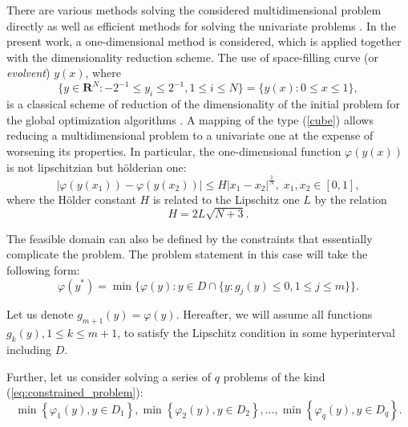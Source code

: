 \documentclass[runningheads]{llncs}
\begin{document}
There are various methods solving the considered multidimensional problem directly
\cite{SergeyevKvasov2017, Jones2009} as well as efficient methods for solving the univariate problems \cite{Norkin1992, Strongin2000}.
In the present work, a one-dimensional method is considered, which is applied together with the
dimensionality reduction scheme.
The use of space-filling curve (or \textit{evolvent}) $y(x)$, where
\begin{equation}
\label{cube}
\lbrace y\in \mathbf{R}^N:-2^{-1}\leqslant y_i\leqslant 2^{-1},1\leqslant i\leqslant
N\rbrace=\{y(x):0\leqslant x\leqslant 1\},
\end{equation}
 is a classical scheme of reduction of the
dimensionality of the initial problem for the global optimization algorithms
\cite{Sergeyev2013}.
A mapping of the type (\ref{cube}) allows reducing a multidimensional problem to a univariate one at the expense of worsening its properties. In particular, the 
one-dimensional function \(\varphi(y(x))\) is not lipschitzian but h\"{o}lderian one:
\begin{displaymath}
\label{holder}
|\varphi(y(x_1))-\varphi(y(x_2))|\leqslant H{|x_1-x_2|}^{\frac{1}{N}}, \; x_1,x_2\in[0,1],
\end{displaymath}
where the H\"{o}lder constant \(H\) is related to the Lipschitz one \(L\) by the relation
\begin{displaymath}
  H=2L\sqrt{N+3}.
\end{displaymath}

The feasible domain can also be defined by the constraints that essentially complicate the problem.
The problem statement in this case will take the following form:
\begin{equation}
  \label{eq:constrained_problem}
  \varphi(y^*)=\min\{\varphi(y):y\in D \cap \{y: g_j(y)\leqslant 0, 1\leqslant j\leqslant m\}\}.
\end{equation}

Let us denote \(g_{m+1}(y)=\varphi(y)\). Hereafter, we will assume all functions
\(g_k(y),1\leqslant k \leqslant m+1\),
to satisfy the Lipschitz condition in some hyperinterval including \(D\).

Further, let us consider solving a series of \(q\) problems of the kind
(\ref{eq:constrained_problem}):
\begin{equation}
  \label{eq:many_problems}
  \min\left\{\varphi_1(y), y\in D_1 \right\}, \min\left\{\varphi_2(y), y\in D_2\right\},...,
\min\left\{\varphi_q(y), y\in D_q\right\}.
\end{equation}
\end{document}
